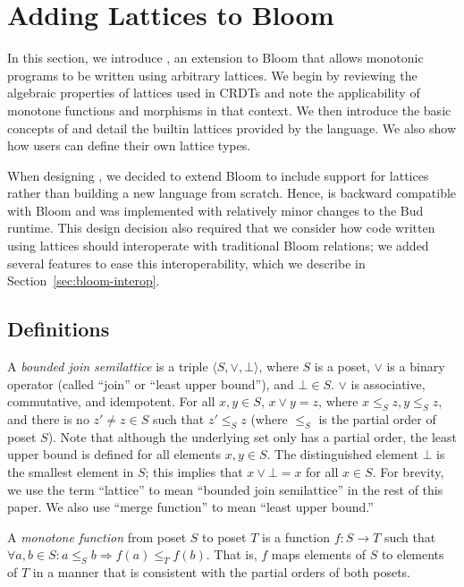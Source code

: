 \section{Adding Lattices to Bloom}
\label{sec:lang}

In this section, we introduce \lang, an extension to Bloom that allows monotonic
programs to be written using arbitrary lattices. We begin by reviewing the
algebraic properties of lattices used in CRDTs and note the applicability of
monotone functions and morphisms in that context. We then introduce the basic
concepts of \lang and detail the builtin lattices provided by the language. We
also show how users can define their own lattice types.

When designing \lang, we decided to extend Bloom to include support for lattices
rather than building a new language from scratch. Hence, \lang is backward
compatible with Bloom and was implemented with relatively minor changes to the
Bud runtime. This design decision also required that we consider how code
written using lattices should interoperate with traditional Bloom relations; we
added several \lang features to ease this interoperability, which we describe in
Section~\ref{sec:bloom-interop}.

\subsection{Definitions}
\label{sec:lattice-defn}
A \emph{bounded join semilattice} is a triple $\langle S, \lor, \bot\rangle$,
where $S$ is a poset, $\lor$ is a binary operator (called ``join'' or ``least
upper bound''), and $\bot \in S$. $\lor$ is associative, commutative, and
idempotent. For all $x, y \in S$, $x \lor y = z$, where $x \leq_S z, y \leq_S
z$, and there is no $z' \ne z \in S$ such that $z' \leq_S z$ (where $\leq_S$ is
the partial order of poset $S$). Note that although the underlying set only has
a partial order, the least upper bound is defined for all elements $x,y \in
S$. The distinguished element $\bot$ is the smallest element in $S$; this
implies that $x \lor \bot = x$ for all $x \in S$. For brevity, we use the term
``lattice'' to mean ``bounded join semilattice'' in the rest of this paper. We
also use ``merge function'' to mean ``least upper bound.''

A \emph{monotone function} from poset $S$ to poset $T$ is a function $f: S \to
T$ such that $\forall a,b \in S: a \leq_S b \Rightarrow f(a) \leq_T f(b)$. That
is, $f$ maps elements of $S$ to elements of $T$ in a manner that is consistent
with the partial orders of both posets.

